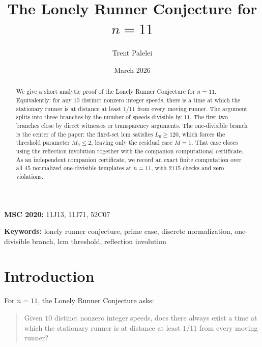 \documentclass[11pt]{article}
\theoremstyle{definition}
\begin{document}
\title{The Lonely Runner Conjecture for $n = 11$}

\author{Trent Palelei}

\date{March 2026}

\maketitle

\begin{abstract}
We give a short analytic proof of the Lonely Runner Conjecture for $n = 11$.
Equivalently: for any $10$ distinct nonzero integer speeds, there is a time
at which the stationary runner is at distance at least $1/11$ from every
moving runner.
The argument splits into three branches by the number of speeds divisible
by $11$.
The first two branches close by direct witnesses or transparency arguments.
The one-divisible branch is the center of the paper: the fixed-set lcm
satisfies $L_0 \geq 120$, which forces the threshold parameter $M_0 \leq 2$,
leaving only the residual case $M = 1$.
That case closes using the reflection involution together with the
companion computational certificate.
As an independent companion certificate, we record an exact finite
computation over all $45$ normalized one-divisible templates at $n = 11$,
with $2115$ checks and zero violations.
\end{abstract}

\medskip
\noindent
\textbf{MSC 2020:} 11J13, 11J71, 52C07

\medskip
\noindent
\textbf{Keywords:} lonely runner conjecture, prime case, discrete
normalization, one-divisible branch, lcm threshold, reflection involution

\tableofcontents

\section{Introduction}

For $n = 11$, the Lonely Runner Conjecture asks:

\begin{quote}
  Given $10$ distinct nonzero integer speeds, does there always exist a
  time at which the stationary runner is at distance at least $1/11$ from
  every moving runner?
\end{quote}
\end{document}
